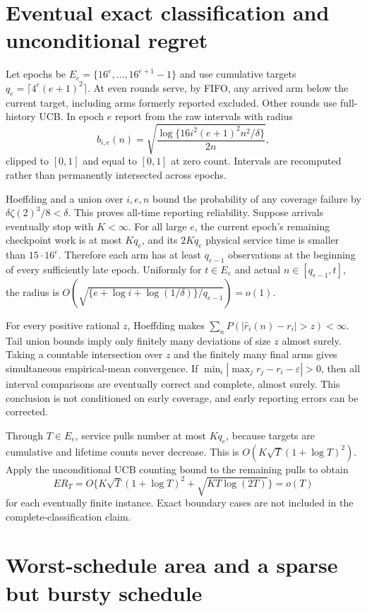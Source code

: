 \section{Eventual exact classification and unconditional regret}
\label{app:consistency}

Let epochs be $E_e=\{16^e,\ldots,16^{e+1}-1\}$ and use cumulative targets
$q_e=\lceil4^e(e+1)^2\rceil$. At even rounds serve, by FIFO, any arrived
arm below the current target, including arms formerly reported excluded.
Other rounds use full-history UCB. In epoch $e$ report from the raw intervals
with radius
\[
 b_{i,e}(n)=\sqrt{\frac{\log\{16i^2(e+1)^2n^2/\delta\}}{2n}},
\]
clipped to $[0,1]$ and equal to $[0,1]$ at zero count. Intervals are
recomputed rather than permanently intersected across epochs.

Hoeffding and a union over $i,e,n$ bound the probability of any coverage
failure by $\delta\zeta(2)^3/8<\delta$. This proves all-time reporting
reliability. Suppose arrivals eventually stop with $K<\infty$. For all large
$e$, the current epoch's remaining checkpoint work is at most $Kq_e$, and
its $2Kq_e$ physical service time is smaller than $15\cdot16^e$. Therefore
each arm has at least $q_{e-1}$ observations at the beginning of every
sufficiently late epoch. Uniformly for $t\in E_e$ and actual
$n\in[q_{e-1},t]$, the radius is
$O(\sqrt{\{e+\log i+\log(1/\delta)\}/q_{e-1}})=o(1)$.

For every positive rational $z$, Hoeffding makes
$\sum_nP(|\hat r_i(n)-r_i|>z)<\infty$. Tail union bounds imply only
finitely many deviations of size $z$ almost surely. Taking a countable
intersection over $z$ and the finitely many final arms gives simultaneous
empirical-mean convergence. If
$\min_i|\max_jr_j-r_i-\varepsilon|>0$, then all interval comparisons
are eventually correct and complete, almost surely. This conclusion is not
conditioned on early coverage, and early reporting errors can be corrected.

Through $T\in E_e$, service pulls number at most $Kq_e$, because targets are
cumulative and lifetime counts never decrease. This is
$O(K\sqrt T(1+\log T)^2)$. Apply the unconditional UCB counting bound to
the remaining pulls to obtain
\[
 ER_T=O\{K\sqrt T(1+\log T)^2+\sqrt{KT\log(2T)}\}=o(T)
\]
for each eventually finite instance. Exact boundary cases are not included
in the complete-classification claim.

\section{Worst-schedule area and a sparse but bursty schedule}
\label{app:worst_area}


